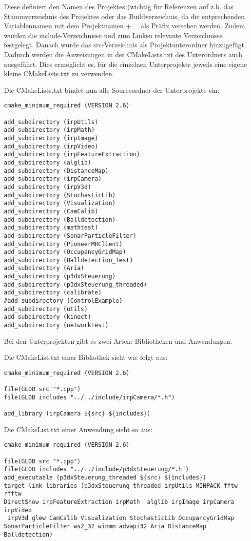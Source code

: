 Diese definiert den Namen des Projektes (wichtig
für Referenzen auf z.b. das Stammverzeichnis des Projektes oder das
Buildverzeichnis, da die entprechenden Variablennamen mit dem Projektnamen
+ \_
als Präfix versehen werden. Zudem wurden die include-Verzeichnisse und zum
Linken relevante Verzeichnisse festgelegt. Danach wurde das src-Verzeichnis
 als
Projektunterordner hinzugefügt. Dadurch werden die Anweisungen in der
CMakeLists.txt des Unterordners auch ausgeführt. Dies ermöglicht es, für
die
einzelnen Unterprojekte jeweils eine eigene kleine CMakeLists.txt zu
verwenden.

Die CMakeLists.txt bindet nun alle Sourceordner der Unterprojekte ein:

\begin{lstlisting}
cmake_minimum_required (VERSION 2.6)

add_subdirectory (irpUtils)
add_subdirectory (irpMath)
add_subdirectory (irpImage)
add_subdirectory (irpVideo)
add_subdirectory (irpFeatureExtraction)
add_subdirectory (alglib)
add_subdirectory (DistanceMap)
add_subdirectory (irpCamera)
add_subdirectory (irpV3d)
add_subdirectory (StochasticLib)
add_subdirectory (Visualization)
add_subdirectory (CamCalib)
add_subdirectory (Balldetection)
add_subdirectory (mathtest)
add_subdirectory (SonarParticleFilter)
add_subdirectory (PioneerMRClient)
add_subdirectory (OccupancyGridMap)
add_subdirectory (Balldetection_Test)
add_subdirectory (Aria)
add_subdirectory (p3dxSteuerung)
add_subdirectory (p3dxSteuerung_threaded)
add_subdirectory (calibrate)
#add_subdirectory (ControlExample)
add_subdirectory (utils)
add_subdirectory (kinect)
add_subdirectory (networkTest)
\end{lstlisting}

Bei den Unterprojekten gibt es zwei Arten: Bibliotheken und Anwendungen.

Die CMakeList.txt einer Bibliothek sieht wie folgt aus:

\begin{lstlisting}
cmake_minimum_required (VERSION 2.6)

file(GLOB src "*.cpp")
file(GLOB includes "../../include/irpCamera/*.h")

add_library (irpCamera ${src} ${includes})
\end{lstlisting}

Die CMakeList.txt einer Anwendung sieht so aus:
\begin{lstlisting}
cmake_minimum_required (VERSION 2.6)

file(GLOB src "*.cpp")
file(GLOB includes "../../include/p3dxSteuerung/*.h")
add_executable (p3dxSteuerung_threaded ${src} ${includes})
target_link_libraries (p3dxSteuerung_threaded irpUtils MINPACK fftw rfftw
DirectShow irpFeatureExtraction irpMath  alglib irpImage irpCamera irpVideo
 irpV3d glew CamCalib Visualization StochasticLib OccupancyGridMap
SonarParticleFilter ws2_32 winmm advapi32 Aria DistanceMap Balldetection)

\end{lstlisting}

